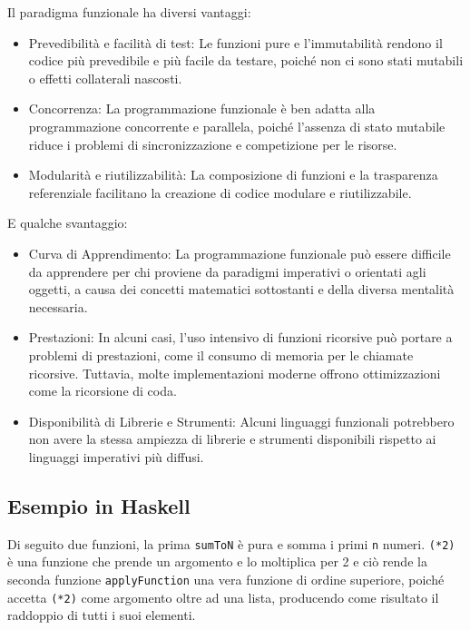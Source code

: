 \documentclass[
  letterpaper,
]{scrbook}
\providecommand{\tightlist}{%
  \setlength{\itemsep}{0pt}\setlength{\parskip}{0pt}}\usepackage{longtable,booktabs,array}
\begin{document}
Il paradigma funzionale ha diversi vantaggi:

\begin{itemize}
\tightlist
\item
  Prevedibilità e facilità di test: Le funzioni pure e l'immutabilità
  rendono il codice più prevedibile e più facile da testare, poiché non
  ci sono stati mutabili o effetti collaterali nascosti.
\item
  Concorrenza: La programmazione funzionale è ben adatta alla
  programmazione concorrente e parallela, poiché l'assenza di stato
  mutabile riduce i problemi di sincronizzazione e competizione per le
  risorse.
\item
  Modularità e riutilizzabilità: La composizione di funzioni e la
  trasparenza referenziale facilitano la creazione di codice modulare e
  riutilizzabile.
\end{itemize}

E qualche svantaggio:

\begin{itemize}
\tightlist
\item
  Curva di Apprendimento: La programmazione funzionale può essere
  difficile da apprendere per chi proviene da paradigmi imperativi o
  orientati agli oggetti, a causa dei concetti matematici sottostanti e
  della diversa mentalità necessaria.
\item
  Prestazioni: In alcuni casi, l'uso intensivo di funzioni ricorsive può
  portare a problemi di prestazioni, come il consumo di memoria per le
  chiamate ricorsive. Tuttavia, molte implementazioni moderne offrono
  ottimizzazioni come la ricorsione di coda.
\item
  Disponibilità di Librerie e Strumenti: Alcuni linguaggi funzionali
  potrebbero non avere la stessa ampiezza di librerie e strumenti
  disponibili rispetto ai linguaggi imperativi più diffusi.
\end{itemize}

\subsection{Esempio in Haskell}\label{esempio-in-haskell}

Di seguito due funzioni, la prima \texttt{sumToN} è pura e somma i primi
\texttt{n} numeri. \texttt{(*2)} è una funzione che prende un argomento
e lo moltiplica per 2 e ciò rende la seconda funzione
\texttt{applyFunction} una vera funzione di ordine superiore, poiché
accetta \texttt{(*2)} come argomento oltre ad una lista, producendo come
risultato il raddoppio di tutti i suoi elementi.
\end{document}
